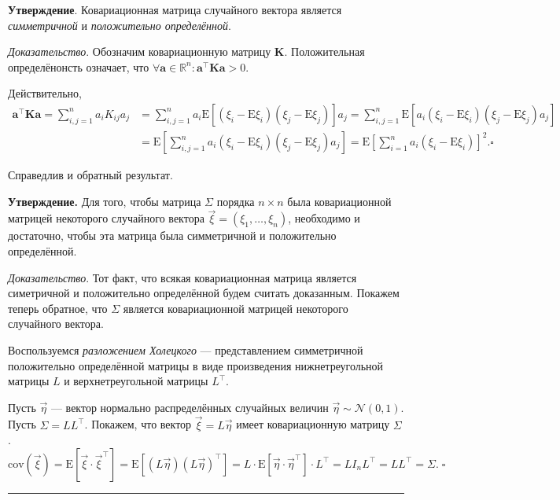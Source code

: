 \documentclass[11pt,a4paper]{article}
\begin{document}
    \textbf{Утверждение}. Ковариационная матрица случайного вектора является
\emph{симметричной} и \emph{положительно определённой}.

\emph{Доказательство}. Обозначим ковариационную матрицу \(\mathbf{K}\).
Положительная определёнонсть означает, что
\(\forall \mathbf{a} \in \mathbb{R}^n: \mathbf{a}^\top \mathbf{K} \mathbf{a} > 0\).

Действительно,
\[\begin{split}
\mathbf{a}^\top \mathbf{K} \mathbf{a} = \sum\limits_{i,j=1}^n a_i K_{ij} a_j
  &= \sum\limits_{i,j=1}^n a_i \mathrm{E}\left[ (\xi_i - \mathrm{E}\xi_i) (\xi_j - \mathrm{E}\xi_j) \right] a_j = \sum\limits_{i,j=1}^n \mathrm{E}\left[ a_i (\xi_i - \mathrm{E}\xi_i) (\xi_j - \mathrm{E}\xi_j) a_j \right] \\
  &= \mathrm{E}\left[ \sum\limits_{i,j=1}^n a_i (\xi_i - \mathrm{E}\xi_i) (\xi_j - \mathrm{E}\xi_j) a_j \right] = \mathrm{E}\left[ \sum\limits_{i=1}^n a_i (\xi_i - \mathrm{E}\xi_i) \right]^2. \mathrm{\square}
\end{split}
\]

    Справедлив и обратный результат.

\textbf{Утверждение.} Для того, чтобы матрица \(\Sigma\) порядка
\(n \times n\) была ковариационной матрицей некоторого случайного
вектора \(\vec\xi = \left( \xi_1, \dots, \xi_n \right)\), необходимо и
достаточно, чтобы эта матрица была симметричной и положительно
определённой.

\emph{Доказательство}. Тот факт, что всякая ковариационная матрица
является симетричной и положительно определённой будем считать
доказанным. Покажем теперь обратное, что \(\Sigma\) является
ковариационной матрицей некоторого случайного вектора.

Воспользуемся \emph{разложением Холецкого} --- представлением
симметричной положительно определённой матрицы в виде произведения
нижнетреугольной матрицы \(L\) и верхнетреугольной матрицы \(L^\top\).

Пусть \(\vec\eta\) --- вектор нормально распределённых случайных величин
\(\vec\eta \sim \mathcal{N}(0, 1)\). Пусть \(\Sigma = L L^\top\).
Покажем, что вектор \(\vec\xi = L\vec\eta\) имеет ковариационную матрицу
\(\Sigma\).
\[
\mathrm{cov}(\vec\xi)
= \mathrm{E} \left[\vec\xi \cdot \vec\xi^\top \right]
= \mathrm{E} \left[(L\vec\eta)(L\vec\eta)^\top \right]
= L \cdot \mathrm{E} \left[\vec\eta \cdot \vec\eta^\top \right] \cdot L^\top
= L I_n L^\top = LL^\top = \Sigma. \; \mathrm{\square}
\]

    \begin{center}\rule{0.5\linewidth}{0.5pt}\end{center}
\end{document}
